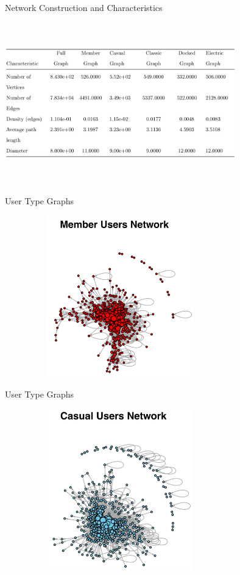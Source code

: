 \documentclass[11pt, xcolor=dvipsnames]{beamer}
\begin{document}
\begin{frame}{Network Construction and Characteristics}
	
		\centering
	\includegraphics[width=10cm, height=7cm]{images/net-characteristics}
\end{frame}

\begin{frame}{User Type Graphs}
	
	\centering
	\includegraphics[width=10cm, height=7cm]{images/member-graph}
	
\end{frame}

\begin{frame}{User Type Graphs}
	
	\centering
	\includegraphics[width=10cm, height=7cm]{images/casual-graph}
	
\end{frame}
\end{document}
